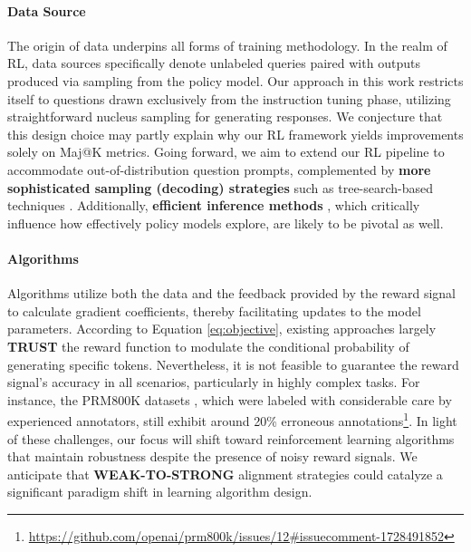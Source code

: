 \begin{itemize}[topsep=0pt]
\begin{itemize}[topsep=0pt]
\paragraph{Data Source} The origin of data underpins all forms of training methodology. In the realm of RL, data sources specifically denote unlabeled queries paired with outputs produced via sampling from the policy model. Our approach in this work restricts itself to questions drawn exclusively from the instruction tuning phase, utilizing straightforward nucleus sampling for generating responses. We conjecture that this design choice may partly explain why our RL framework yields improvements solely on Maj@K metrics. Going forward, we aim to extend our RL pipeline to accommodate out-of-distribution question prompts, complemented by \textbf{more sophisticated sampling (decoding) strategies} such as tree-search-based techniques \citep{yao2023tree}. Additionally, \textbf{efficient inference methods} \citep{xia-etal-2023-speculative,leviathan2023fast,kwon2023efficient,xia2024unlocking}, which critically influence how effectively policy models explore, are likely to be pivotal as well.

\paragraph{Algorithms} Algorithms utilize both the data and the feedback provided by the reward signal to calculate gradient coefficients, thereby facilitating updates to the model parameters. According to Equation \ref{eq:objective}, existing approaches largely \textbf{TRUST} the reward function to modulate the conditional probability of generating specific tokens. Nevertheless, it is not feasible to guarantee the reward signal's accuracy in all scenarios, particularly in highly complex tasks. For instance, the PRM800K datasets \citep{lightman2023let}, which were labeled with considerable care by experienced annotators, still exhibit around 20\% erroneous annotations\footnote{\url{https://github.com/openai/prm800k/issues/12\#issuecomment-1728491852}}. In light of these challenges, our focus will shift toward reinforcement learning algorithms that maintain robustness despite the presence of noisy reward signals. We anticipate that \textbf{WEAK-TO-STRONG} alignment strategies \citep{burns2023weak} could catalyze a significant paradigm shift in learning algorithm design.


\end{itemize}
\end{itemize}
